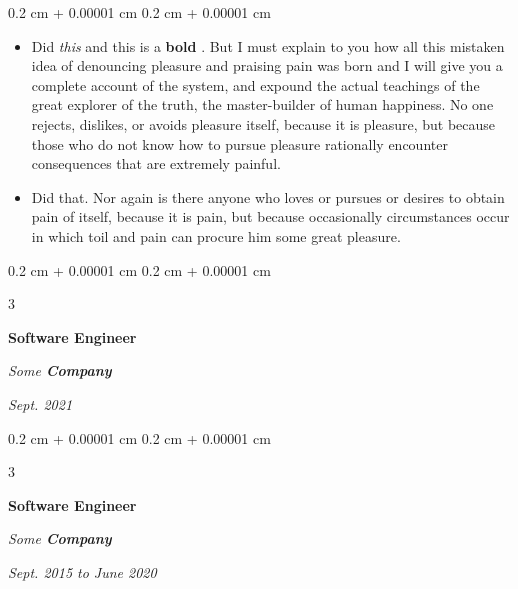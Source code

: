 \documentclass[10pt, letterpaper]{article}
\newenvironment{highlights}{
    \begin{itemize}[
        topsep=0.10 cm,
        parsep=0.10 cm,
        partopsep=0pt,
        itemsep=0pt,
        leftmargin=0.4 cm + 10pt + 0.6 cm
    ]
}{
    \end{itemize}
} %
\newenvironment{onecolentry}{
    \begin{adjustwidth}{
        0.2 cm + 0.00001 cm
    }{
        0.2 cm + 0.00001 cm
    }
}{
    \end{adjustwidth}
} %
\newenvironment{threecolentry}[3][]{
    \onecolentry
    \def\thirdColumn{#3}
    \setcolumnwidth{0.6 cm, \fill, 4.5 cm}
    \begin{paracol}{3}
    #2 \switchcolumn
}{
    \switchcolumn \raggedleft \thirdColumn
    \end{paracol}
    \endonecolentry
} %
\let\hrefWithoutArrow\href
\renewcommand{\href}[2]{\hrefWithoutArrow{#1}{\mbox{\ifthenelse{\equal{#2}{}}{ }{#2 }\raisebox{.15ex}{\footnotesize \faExternalLink*}}}}
\begin{document}
        \vspace{0.10 cm-3px}
        \begin{onecolentry}
            \begin{highlights}
                \item Did \textit{this} and this is a \textbf{bold} \href{https://example.com}{link}. But I must explain to you how all this mistaken idea of denouncing pleasure and praising pain was born and I will give you a complete account of the system, and expound the actual teachings of the great explorer of the truth, the master-builder of human happiness. No one rejects, dislikes, or avoids pleasure itself, because it is pleasure, but because those who do not know how to pursue pleasure rationally encounter consequences that are extremely painful.
                \item Did that. Nor again is there anyone who loves or pursues or desires to obtain pain of itself, because it is pain, but because occasionally circumstances occur in which toil and pain can procure him some great pleasure.
            \end{highlights}
        \end{onecolentry}


        \vspace{0.2 cm-3px}

        \begin{threecolentry}{
            \vspace*{\fill}
            \textbullet
            \vspace*{3px}
            \vspace*{\fill}
        }{
            
            
        \textit{Sept. 2021}}
            \textbf{Software Engineer}
            
            \textit{Some \textbf{Company}}
        \end{threecolentry}



        \vspace{0.2 cm-3px}

        \begin{threecolentry}{
            \vspace*{\fill}
            \textbullet
            \vspace*{3px}
            \vspace*{\fill}
        }{
            
            
        \textit{Sept. 2015 to June 2020}}
            \textbf{Software Engineer}
            
            \textit{Some \textbf{Company}}
        \end{threecolentry}
\end{document}
